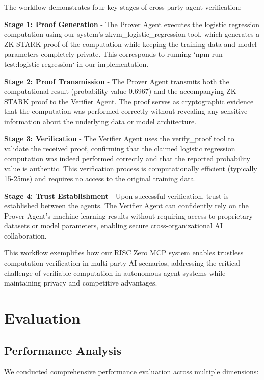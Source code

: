 \documentclass[11pt]{article}
\begin{document}
The workflow demonstrates four key stages of cross-party agent verification:

\textbf{Stage 1: Proof Generation} - The Prover Agent executes the logistic regression computation using our system's zkvm\_logistic\_regression tool, which generates a ZK-STARK proof of the computation while keeping the training data and model parameters completely private. This corresponds to running `npm run test:logistic-regression` in our implementation.

\textbf{Stage 2: Proof Transmission} - The Prover Agent transmits both the computational result (probability value 0.6967) and the accompanying ZK-STARK proof to the Verifier Agent. The proof serves as cryptographic evidence that the computation was performed correctly without revealing any sensitive information about the underlying data or model architecture.

\textbf{Stage 3: Verification} - The Verifier Agent uses the verify\_proof tool to validate the received proof, confirming that the claimed logistic regression computation was indeed performed correctly and that the reported probability value is authentic. This verification process is computationally efficient (typically 15-25ms) and requires no access to the original training data.

\textbf{Stage 4: Trust Establishment} - Upon successful verification, trust is established between the agents. The Verifier Agent can confidently rely on the Prover Agent's machine learning results without requiring access to proprietary datasets or model parameters, enabling secure cross-organizational AI collaboration.

This workflow exemplifies how our RISC Zero MCP system enables trustless computation verification in multi-party AI scenarios, addressing the critical challenge of verifiable computation in autonomous agent systems while maintaining privacy and competitive advantages.

\section{Evaluation}
\label{sec:evaluation}

\subsection{Performance Analysis}

We conducted comprehensive performance evaluation across multiple dimensions:
\end{document}
